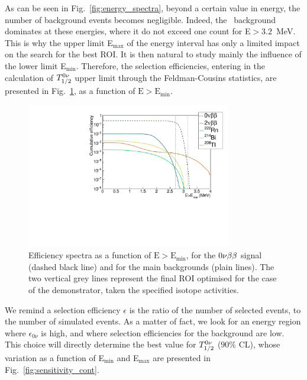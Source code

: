 As can be seen in Fig.~\ref{fig:energy_spectra}, beyond a certain value in energy, the number of background events becomes negligible.
Indeed, the \Tl\ background dominates at these energies, where it do not exceed one count for E$>3.2$~MeV.
This is why the upper limit E$_{\text{max}}$ of the energy interval has only a limited impact on the search for the best ROI.
It is then natural to study mainly the influence of the lower limit E$_{\text{min}}$.
Therefore, the selection efficiencies, entering in the calculation of $T_{1/2}^{0\nu}$ upper limit through the Feldman-Cousins statistics, are presented in Fig.~\ref{fig:efficiency_spectra}, as a function of $\text{E}>\text{E}_{\text{min}}$.
\begin{figure}[h]
  \centering
  \includegraphics[width=0.8\textwidth]{Sensitivity/fig_sensitivity/efficiency_spectrum_with_B_82Se.pdf}
  \caption{Efficiency spectra as a function of $\text{E}>\text{E}_{\text{min}}$, for the $0\nu\beta\beta$ signal (dashed black line) and for the main backgrounds (plain lines).
    The two vertical grey lines represent the final ROI optimised for the case of the demonstrator, taken the specified isotope activities.
    \label{fig:efficiency_spectra}}
\end{figure}
We remind a selection efficiency $\epsilon$ is the ratio of the number of selected events, to the number of simulated events.
As a matter of fact, we look for an energy region where $\epsilon_{0\nu}$ is high, and where selection efficiencies for the background are low.
This choice will directly determine the best value for $T_{1/2}^{0\nu}$ ($90\%$ CL), whose variation as a function of E$_{\text{min}}$ and E$_{\text{max}}$ are presented in Fig.~\ref{fig:sensitivity_cont}.
